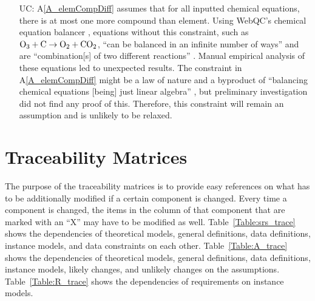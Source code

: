 \documentclass[12pt]{article}
\newcommand{\gdref}[1]{GD\ref{#1}}
\newcommand{\aref}[1]{A\ref{#1}}
\newcommand{\iref}[1]{IM\ref{#1}}
\newcounter{ucnum} %
\begin{document}
\begin{itemize}


  \item[UC\refstepcounter{ucnum}\theucnum\label{UC_allEqsPermitted}:]
    \aref{A_elemCompDiff} assumes that for all inputted chemical equations,
    there is at most one more compound than element. Using WebQC's chemical
    equation balancer \cite{noauthor_balance_2023}, equations without this
    constraint, such as $\ce{O3} + \ce{C} \rightarrow \ce{O2} + \ce{CO2}$,
    ``can be balanced in an infinite number of ways'' and are
    ``combination[s] of two different reactions'' \cite{noauthor_balance_2023}.
    Manual empirical analysis of these equations led to unexpected results.
    The constraint in \aref{A_elemCompDiff} might be a law of nature and a
    byproduct of ``balancing chemical equations [being] just linear algebra''
    \cite[p.~193]{risteski_new_2021}, but preliminary investigation did not
    find any proof of this. Therefore, this constraint will remain an
    assumption and is unlikely to be relaxed.

\end{itemize}

\section{Traceability Matrices } \label{sec_traceMats}

The purpose of the traceability matrices is to provide easy references on what
has to be additionally modified if a certain component is changed.  Every time a
component is changed, the items in the column of that component that are marked
with an ``X'' may have to be modified as well. Table~\ref{Table:srs_trace} shows
the dependencies of theoretical models, general definitions, data definitions,
instance models, and data constraints on each other. Table~\ref{Table:A_trace}
shows the dependencies of theoretical models,
general definitions, data definitions, instance models, likely changes, and
unlikely changes on the assumptions. Table~\ref{Table:R_trace}
shows the dependencies of requirements on instance models.
\end{document}
